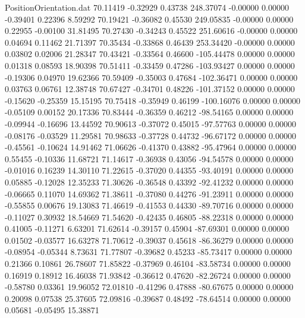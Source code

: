 \begin{filecontents}{PositionOrientation.dat}
  70.11419   -0.32929    0.43738   248.37074   -0.00000    0.00000   -0.39401    0.22396    8.59292
  70.19421   -0.36082    0.45530   249.05835   -0.00000    0.00000    0.22955   -0.00100   31.81495
  70.27430   -0.34243    0.45522   251.60616   -0.00000    0.00000    0.04694    0.11462   21.71397
  70.35434   -0.33868    0.46439   253.34420   -0.00000    0.00000    0.03802    0.02006   21.28347
  70.43421   -0.33564    0.46600  -105.44478    0.00000    0.00000    0.01318    0.08593   18.90398
  70.51411   -0.33459    0.47286  -103.93427    0.00000    0.00000   -0.19306    0.04970   19.62366
  70.59409   -0.35003    0.47684  -102.36471    0.00000    0.00000    0.03763    0.06761   12.38748
  70.67427   -0.34701    0.48226  -101.37152    0.00000    0.00000   -0.15620   -0.25359   15.15195
  70.75418   -0.35949    0.46199  -100.16076    0.00000    0.00000   -0.05109    0.00152   20.17336
  70.83444   -0.36359    0.46212   -98.54165    0.00000    0.00000   -0.09944   -0.16696   13.44592
  70.90613   -0.37072    0.45015   -97.57763    0.00000    0.00000   -0.08176   -0.03529   11.29581
  70.98633   -0.37728    0.44732   -96.67172    0.00000    0.00000   -0.45561   -0.10624   14.91462
  71.06626   -0.41370    0.43882   -95.47964    0.00000    0.00000    0.55455   -0.10336   11.68721
  71.14617   -0.36938    0.43056   -94.54578    0.00000    0.00000   -0.01016    0.16239   14.30110
  71.22615   -0.37020    0.44355   -93.40191    0.00000    0.00000    0.05885   -0.12028   12.35233
  71.30626   -0.36548    0.43392   -92.41232    0.00000    0.00000   -0.06665    0.11070   14.69362
  71.38611   -0.37080    0.44276   -91.23911    0.00000    0.00000   -0.55855    0.00676   19.13083
  71.46619   -0.41553    0.44330   -89.70716    0.00000    0.00000   -0.11027    0.30932   18.54669
  71.54620   -0.42435    0.46805   -88.22318    0.00000    0.00000    0.41005   -0.11271    6.63201
  71.62614   -0.39157    0.45904   -87.69301    0.00000    0.00000    0.01502   -0.03577   16.63278
  71.70612   -0.39037    0.45618   -86.36279    0.00000    0.00000   -0.08954   -0.05344    8.73631
  71.77807   -0.39682    0.45233   -85.73417    0.00000    0.00000    0.21366    0.10861   26.78607
  71.85822   -0.37969    0.46104   -83.58734    0.00000    0.00000    0.16919    0.18912   16.46038
  71.93842   -0.36612    0.47620   -82.26724    0.00000    0.00000   -0.58780    0.03361   19.96052
  72.01810   -0.41296    0.47888   -80.67675    0.00000    0.00000    0.20098    0.07538   25.37605
  72.09816   -0.39687    0.48492   -78.64514    0.00000    0.00000    0.05681   -0.05495   15.38871

\end{filecontents}
